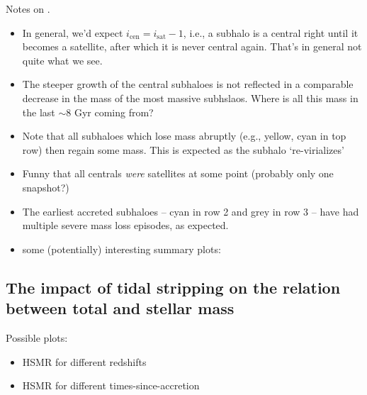 \documentclass[usenatbib,fleqn]{mnras}
\newcommand{\Msun}{\mathrm{M}_\odot}
\begin{document}
\noindent
Notes on .
\begin{itemize}
  \item In general, we'd expect $i_\mathrm{cen} = i_\mathrm{sat} - 1$, i.e., a subhalo is a central right until it becomes a satellite, after which it is never central again. That's in general not quite what we see.
  \item The steeper growth of the central subhaloes is not reflected in a comparable decrease in the mass of the most massive subhslaos. Where is all this mass in the last $\sim$8 Gyr coming from?
  \item Note that all subhaloes which lose mass abruptly (e.g., yellow, cyan in top row) then regain some mass. This is expected as the subhalo `re-virializes'
  \item Funny that all centrals \emph{were} satellites at some point (probably only one snapshot?)
  \item The earliest accreted subhaloes -- cyan in row 2 and grey in row 3 -- have had multiple severe mass loss episodes, as expected.
  \item some (potentially) interesting summary plots:
%    
\end{itemize}

\subsection{The impact of tidal stripping on the relation between total and stellar mass}

Possible plots:
\begin{itemize}
  \item HSMR for different redshifts
  \item HSMR for different times-since-accretion
\end{itemize}

\end{document}
